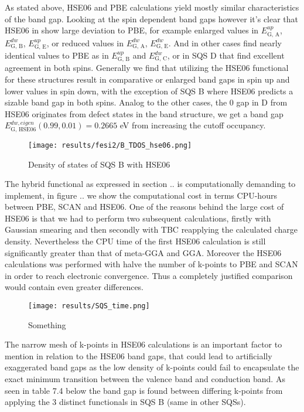 As stated above, HSE06 and PBE calculations yield mostly similar characteristics of the band gap. Looking at the spin dependent band gaps however it's clear that HSE06 in show large deviation to PBE, for example enlarged values in $E_\text{G, A} ^{up}$, $E_\text{G, B} ^{dw}$, $E_\text{G, E} ^{up}$, or reduced values in $E_\text{G, A} ^{dw}$, $E_\text{G, E} ^{dw}$. And in other cases find nearly identical values to PBE as in $E_\text{G, B} ^{up}$ and $E_\text{G, C} ^{dw}$, or in SQS D that find excellent agreement in both spins. Generally we find that utilizing the HSE06 functional for these structures result in comparative or enlarged band gaps in spin up and lower values in spin down, with the exception of SQS B where HSE06 predicts a sizable band gap in both spins. Analog to the other cases, the 0 gap in D from HSE06 originates from defect states in the band structure, we get a band gap $E_\text{G, HSE06} ^{dw, eigen}(0.99, 0.01) = 0.2665$ eV from increasing the cutoff occupancy.
   
\begin{figure}[H]
	\centering	
	\texttt{[image: results/fesi2/B\_TDOS\_hse06.png]}
	\caption{Density of states of SQS B with HSE06}
\end{figure}
 
The hybrid functional as expressed in section .. is computationally demanding to implement, in figure .. we show the computational cost in terms CPU-hours between PBE, SCAN and HSE06. One of the reasons behind the large cost of HSE06 is that we had to perform two subsequent calculations, firstly with Gaussian smearing and then secondly with TBC reapplying the calculated charge density. Nevertheless the CPU time of the first HSE06 calculation is still significantly greater than that of meta-GGA and GGA. Moreover the HSE06 calculations was performed with halve the number of k-points to PBE and SCAN in order to reach electronic convergence. Thus a completely justified comparison would contain even greater differences. 

\begin{figure}[H]
\centering
\texttt{[image: results/SQS\_time.png]}
\caption{Something}
\end{figure}

The narrow mesh of k-points in HSE06 calculations is an important factor to mention in relation to the HSE06 band gaps, that could lead to artificially exaggerated band gaps as the low density of k-points could fail to encapsulate the exact minimum transition between the valence band and conduction band. As seen in table 7.4 below the band gap is found between differing k-points from applying the 3 distinct functionals in SQS B (same in other SQSs).

